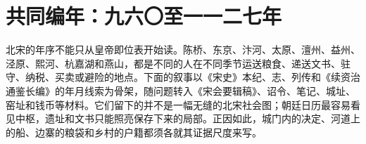 \section{共同编年：九六〇至一一二七年}

北宋的年序不能只从皇帝即位表开始读。陈桥、东京、汴河、太原、澶州、益州、泾原、熙河、杭嘉湖和燕山，都是不同的人在不同季节运送粮食、递送文书、驻守、纳税、买卖或避险的地点。下面的叙事以《宋史》本纪、志、列传和《续资治通鉴长编》的年月线索为骨架，随问题转入《宋会要辑稿》、诏令、笔记、城址、窑址和钱币等材料。它们留下的并不是一幅无缝的北宋社会图；朝廷日历最容易看见中枢，遗址和文书只能照亮保存下来的局部。正因如此，城门内的决定、河道上的船、边寨的粮袋和乡村的户籍都须各就其证据尺度来写。



